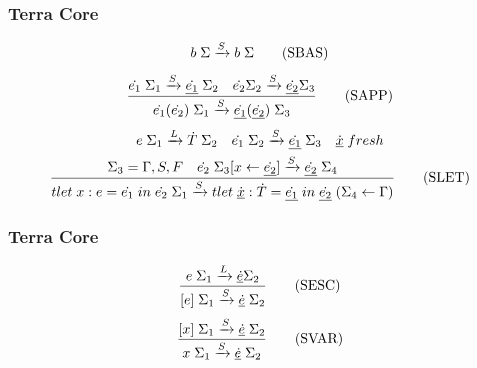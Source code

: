 \documentclass{beamer}
\begin{document}
\begin{frame}
	\frametitle{Terra Core}
  \begin{equation}
    b \thickspace \Sigma \xrightarrow[]{S} b \thickspace \Sigma \tag{SBAS}
  \end{equation}
  \newline
  \begin{equation}
    \frac{\dot{e_1} \thickspace \Sigma_1 \xrightarrow[]{S} \underline{\dot{e_1}} \thickspace \Sigma_2 \quad \dot{e_2} \Sigma_2 \xrightarrow[]{S} \underline{\dot{e_2}} \Sigma_3}{\dot{e_1}(\dot{e_2}) \thickspace \Sigma_1 \xrightarrow[]{S} \underline{\dot{e_1}}(\underline{\dot{e_2}}) \thickspace \Sigma_3} \tag{SAPP}
  \end{equation}
  \newline
  \begin{gather*}
    e \thickspace \Sigma_1 \xrightarrow[]{L} \dot{T} \thickspace \Sigma_2 \quad \dot{e_1} \thickspace \Sigma_2  \xrightarrow[]{S} \underline{\dot{e_1}} \thickspace \Sigma_3 \quad \underline{\dot{x}} \thickspace fresh \\
    \frac{\Sigma_3 = \Gamma, S, F \quad \dot{e_2} \thickspace \Sigma_3[x \leftarrow \underline{\dot{e_2}}] \xrightarrow[]{S} \underline{\dot{e_2}} \thickspace \Sigma_4}{tlet \thickspace x: e = \dot{e_1} \thickspace in \thickspace \dot{e_2} \thickspace \Sigma_1 \xrightarrow[]{S} tlet \thickspace \underline{\dot{x}}: \dot{T} = \underline{\dot{e_1}} \thickspace in \thickspace \underline{\dot{e_2}} \thickspace (\Sigma_4 \leftarrow \Gamma)}\tag{SLET}
  \end{gather*}
\end{frame}

\begin{frame}
	\frametitle{Terra Core}
  \begin{equation}
    \frac{e \thickspace \Sigma_1 \xrightarrow[]{L} \underline{\dot{e}} \Sigma_2}{[e] \thickspace \Sigma_1 \xrightarrow[]{S} \underline{\dot{e}} \thickspace \Sigma_2} \tag{SESC}
  \end{equation}
  \newline
  \begin{equation}
    \frac{[x] \thickspace \Sigma_1 \xrightarrow[]{S} \underline{\dot{e}} \thickspace \Sigma_2}{x \thickspace \Sigma_1 \xrightarrow[]{S} \underline{\dot{e}} \thickspace \Sigma_2} \tag{SVAR}
  \end{equation}
\end{frame}
\end{document}
